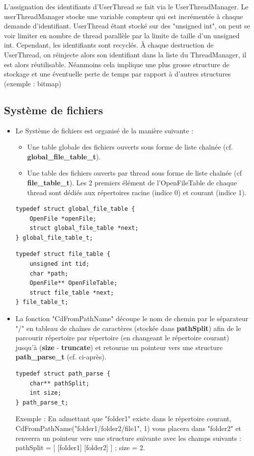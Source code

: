 \documentclass{article}
\begin{document}
L'assignation des identifiants d'UserThread se fait via le UserThreadManager. Le userThreadManager stocke une variable compteur qui est incrémentée à chaque demande d'identifiant. UserThread étant stocké sur des "unsigned int", on peut se voir limiter en nombre de thread parallèle par la limite de taille d'un unsigned int. Cependant, les identifiants sont recyclés. À chaque destruction de UserThread, on réinjecte alors son identifiant dans la liste du ThreadManager, il est alors réutilisable. Néanmoins cela implique une plus grosse structure de stockage et une éventuelle perte de temps par rapport à d'autres structures (exemple : bitmap)

\subsection{Système de fichiers}
\begin{itemize}
\item
Le Système de fichiers est organisé de la manière suivante :
\begin{itemize}
	\item
	Une table globale des fichiers ouverts sous forme de liste chaînée (cf.  \textbf{global\_file\_table\_t}).
	\item
	Une table des fichiers ouverts par thread sous forme de liste chaînée (cf \textbf{file\_table\_t}). Les 2 premiers élément de l'OpenFileTable de chaque thread sont dédiés aux répertoires racine (indice 0) et courant (indice 1).

\end{itemize}

 \begin{lstlisting}[frame=single]
typedef struct global_file_table {
    OpenFile *openFile;
    struct global_file_table *next;
} global_file_table_t;
  \end{lstlisting}

  \begin{lstlisting}[frame=single]
typedef struct file_table {
    unsigned int tid;
    char *path;
    OpenFile** OpenFileTable;
    struct file_table *next;
} file_table_t;
  \end{lstlisting}

 \item
La fonction "CdFromPathName"  découpe le nom de chemin par le séparateur "/" en tableau de chaînes de caractères (stockée dans \textbf{pathSplit}) afin de le parcourir répertoire par répertoire (en changeant le répertoire courant) jusqu'à (\textbf{size} - \textbf{truncate}) et retourne un pointeur vers une  structure \textbf{path\_parse\_t} (cf. ci-après).


  \begin{lstlisting}[frame=single]
  typedef struct path_parse {
    char** pathSplit;
    int size;
} path_parse_t;
  \end{lstlisting}

  Exemple :
  En admettant que "folder1" existe dans le répertoire courant, CdFromPathName("folder1/folder2/file1", 1) vous placera dans "folder2" et renverra un pointeur vers une structure suivante avec les champs suivants :
  pathSplit = [ [folder1] [folder2] ] ; size = 2.

 \end{itemize}
\end{document}
